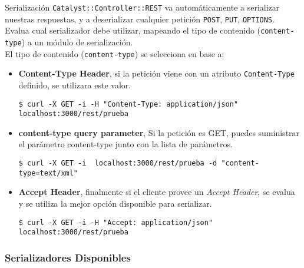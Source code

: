 \begin{frame}[fragile]{Serialización} %
    \texttt{Catalyst::Controller::REST} va automáticamente a serializar
    nuestras respuestas, y a deserializar cualquier petición \texttt{POST},
    \texttt{PUT}, \texttt{OPTIONS}. Evalua cual serializador debe utilizar, mapeando
    el tipo de contenido (\texttt{content-type}) a un módulo de serialización.\\[0.5cm]

    El tipo de contenido (\texttt{content-type}) se selecciona en base a: 

\footnotesize{

    \begin{itemize}
        \item \textbf{Content-Type Header}, si la petición viene con un
        atributo \texttt{Content-Type} definido,  se utilizara este valor. 
\begin{verbatim}
$ curl -X GET -i -H "Content-Type: application/json" localhost:3000/rest/prueba
\end{verbatim}

        \item \textbf{content-type query parameter},  Si la petición es GET,
        puedes suministrar el parámetro content-type junto con la lista de
        parámetros.
\begin{verbatim}
$ curl -X GET -i  localhost:3000/rest/prueba -d "content-type=text/xml"
\end{verbatim}

        \item \textbf{Accept Header}, finalmente si el cliente provee un
        \textit{Accept Header}, se evalua y se utiliza la mejor opción
        disponible para serializar. 
\begin{verbatim}
$ curl -X GET -i -H "Accept: application/json" localhost:3000/rest/prueba
\end{verbatim}
    \end{itemize}

    }
\end{frame}

\subsubsection{Serializadores Disponibles} 

